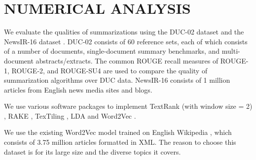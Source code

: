 \documentclass[a4paper,twoside]{article}
\begin{document}
\section{\uppercase{Numerical Analysis}}
\label{sec:experiments}

%

\noindent We evaluate the qualities of summarizations using the DUC-02 dataset \cite{DUC02}
and the NewsIR-16 dataset \cite{Signal1M2016}.
DUC-02 consists of 60 reference sets, each of which consists of a number of documents, single-document summary benchmarks, and multi-document abstracts/extracts.
The common ROUGE recall measures of ROUGE-1, ROUGE-2, and ROUGE-SU4 are used to compare the quality of summarization algorithms over DUC data.
NewsIR-16 consists of 1 million articles %
from English news media sites and blogs.

We use various software packages to implement TextRank (with window size = 2) \cite{TRurl}, RAKE \cite{RAurl}, TexTiling \cite{TTurl}, LDA and Word2Vec \cite{gen}.
%
%

We use the existing Word2Vec model trained on English Wikipedia \cite{wiki},
which consists of 3.75 million articles formatted in XML. The reason to choose this dataset is
for its large size and the diverse topics it covers.
\end{document}
